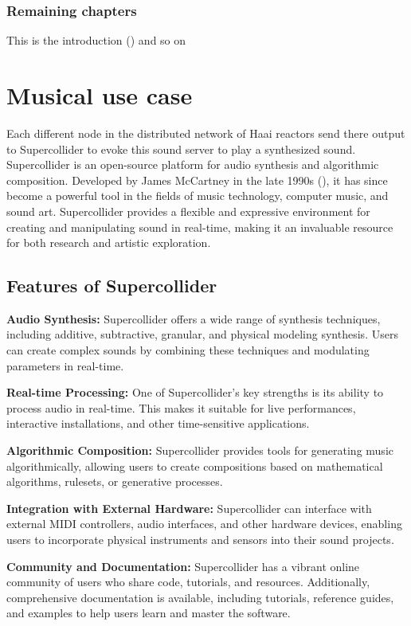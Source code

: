 \documentclass[a4paper]{book}
\begin{document}
\subsection{Remaining chapters}
This is the introduction (\cite{oeyen2022reactive}) and so on 

\chapter{Musical use case}
Each different node in the distributed network of Haai reactors send there output to Supercollider to evoke this sound server to play a synthesized sound.
Supercollider is an open-source platform for audio synthesis and algorithmic composition. Developed by James McCartney in the late 1990s (\cite{scBook}), it has since become a powerful tool in the fields of music technology, computer music, and sound art. Supercollider provides a flexible and expressive environment for creating and manipulating sound in real-time, making it an invaluable resource for both research and artistic exploration. 
\section{Features of Supercollider}

\textbf{Audio Synthesis:} Supercollider offers a wide range of synthesis techniques, including additive, subtractive, granular, and physical modeling synthesis. Users can create complex sounds by combining these techniques and modulating parameters in real-time.


\textbf{Real-time Processing:} One of Supercollider's key strengths is its ability to process audio in real-time. This makes it suitable for live performances, interactive installations, and other time-sensitive applications.

\textbf{Algorithmic Composition:} Supercollider provides tools for generating music algorithmically, allowing users to create compositions based on mathematical algorithms, rulesets, or generative processes.

\textbf{Integration with External Hardware:} Supercollider can interface with external MIDI controllers, audio interfaces, and other hardware devices, enabling users to incorporate physical instruments and sensors into their sound projects.

\textbf{Community and Documentation:} Supercollider has a vibrant online community of users who share code, tutorials, and resources. Additionally, comprehensive documentation is available, including tutorials, reference guides, and examples to help users learn and master the software.
\end{document}
